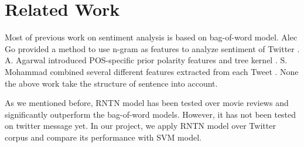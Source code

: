 \section{Related Work}
\label{sec:related}

Most of previous work on sentiment analysis is based on bag-of-word model. Alec Go provided a method to use n-gram as features to analyze sentiment of Twitter \cite{Go:2009}. A. Agarwal introduced POS-specific prior polarity features and tree kernel \cite{Agarwal:2011}. S. Mohammad  combined several different features extracted from each Tweet \cite{Mohammad:2013}. None the above work take the structure of sentence into account. 

As we mentioned before, RNTN model has been tested over movie reviews and significantly outperform the bag-of-word models\cite{Socher:2013}. However, it has not been tested on twitter message yet. In our project, we apply RNTN model over Twitter corpus and compare its performance with SVM model. 




